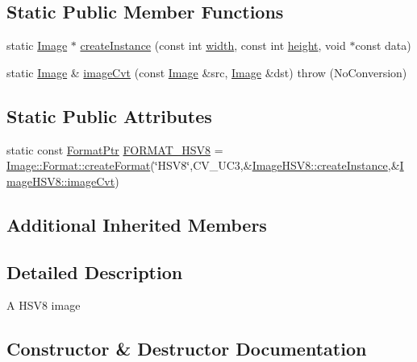 \subsection*{Static Public Member Functions}
\begin{DoxyCompactItemize}
\item 
static \hyperlink{classcolorspaces_1_1_image}{Image} $\ast$ \hyperlink{classcolorspaces_1_1_image_h_s_v8_a2902afeba297cbf8c9278c567c943966}{create\+Instance} (const int \hyperlink{classcolorspaces_1_1_image_ab80af7d4797110c23ed575b329ec7c4f}{width}, const int \hyperlink{classcolorspaces_1_1_image_a99a05ebd37f61215b2c3042ecaefdbfc}{height}, void $\ast$const data)
\item 
static \hyperlink{classcolorspaces_1_1_image}{Image} \& \hyperlink{classcolorspaces_1_1_image_h_s_v8_a95bd0f819144ad097ab64ec82051f796}{image\+Cvt} (const \hyperlink{classcolorspaces_1_1_image}{Image} \&src, \hyperlink{classcolorspaces_1_1_image}{Image} \&dst)  throw (\+No\+Conversion)
\end{DoxyCompactItemize}
\subsection*{Static Public Attributes}
\begin{DoxyCompactItemize}
\item 
static const \hyperlink{classcolorspaces_1_1_image_ab3978cc7acc2b5e855f8c715f09667d1}{Format\+Ptr} \hyperlink{classcolorspaces_1_1_image_h_s_v8_ac6257ac7a1d55ddf8347f19c163abfa2}{F\+O\+R\+M\+A\+T\+\_\+\+H\+S\+V8} = \hyperlink{classcolorspaces_1_1_image_1_1_format_ae79208f237b72cf596331ebcec2ff58b}{Image\+::\+Format\+::create\+Format}(\char`\"{}H\+S\+V8\char`\"{},C\+V\+\_\+U\+C3,\&\hyperlink{classcolorspaces_1_1_image_h_s_v8_a2902afeba297cbf8c9278c567c943966}{Image\+H\+S\+V8\+::create\+Instance},\&\hyperlink{classcolorspaces_1_1_image_h_s_v8_a95bd0f819144ad097ab64ec82051f796}{Image\+H\+S\+V8\+::image\+Cvt})
\end{DoxyCompactItemize}
\subsection*{Additional Inherited Members}


\subsection{Detailed Description}
A H\+S\+V8 image 

\subsection{Constructor \& Destructor Documentation}
\mbox{\label{classcolorspaces_1_1_image_h_s_v8_ada49490260f27a0375ad4003d6b2e7c4}} 
